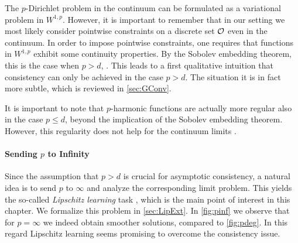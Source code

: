 The $p$-Dirichlet problem in the continuum can be formulated as a variational problem in $W^{1,p}$. However, it is important to remember that in our setting we most likely consider pointwise constraints on a discrete set $\mathcal{O}$ even in the continuum. In order to impose pointwise constraints, one requires that functions in $W^{1,p}$ exhibit some continuity properties. By the Sobolev embedding theorem, this is the case when $p>d$, \cite{adams2003sobolev}. This leads to a first qualitative intuition that consistency can only be achieved in the case $p>d$. The situation it is in fact more subtle, which is reviewed in \cref{sec:GConv}. 

It is important to note that $p$-harmonic functions are actually more regular also in the case $p\leq d$, beyond the implication of the Sobolev embedding theorem. However, this regularity does not help for the continuum limits \cite{nadler2009statistical, alamgir2011phase, el2016asymptotic}.

\paragraph{Sending $p$ to Infinity} 

Since the assumption that $p>d$ is crucial for asymptotic consistency, a natural idea is to send $p$ to $\infty$ and analyze the corresponding limit problem. This yields the so-called \emph{Lipschitz learning} task \cite{von2004distance, kyng2015algorithms}, which is the main point of interest in this chapter. We formalize this problem in \cref{sec:LipExt}. In \cref{fig:pinf} we observe that for $p=\infty$ we indeed obtain smoother solutions, compared to \cref{fig:pdeg}. In this regard Lipschitz learning seems promising to overcome the consistency issue.

